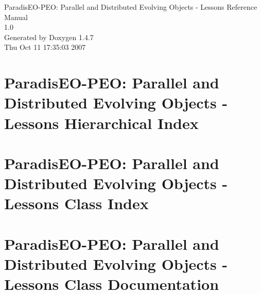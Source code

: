 \documentclass[a4paper]{book}
\begin{document}
\begin{titlepage}
\vspace*{7cm}
\begin{center}
{\Large Paradis\-EO-PEO: Parallel and Distributed Evolving Objects - Lessons Reference Manual\\[1ex]\large 1.0 }\\
\vspace*{1cm}
{\large Generated by Doxygen 1.4.7}\\
\vspace*{0.5cm}
{\small Thu Oct 11 17:35:03 2007}\\
\end{center}
\end{titlepage}
\clearemptydoublepage
{}
\tableofcontents
\clearemptydoublepage
{}
\chapter{Paradis\-EO-PEO: Parallel and Distributed Evolving Objects - Lessons Hierarchical Index}

\chapter{Paradis\-EO-PEO: Parallel and Distributed Evolving Objects - Lessons Class Index}

\chapter{Paradis\-EO-PEO: Parallel and Distributed Evolving Objects - Lessons Class Documentation}














\printindex
\end{document}
